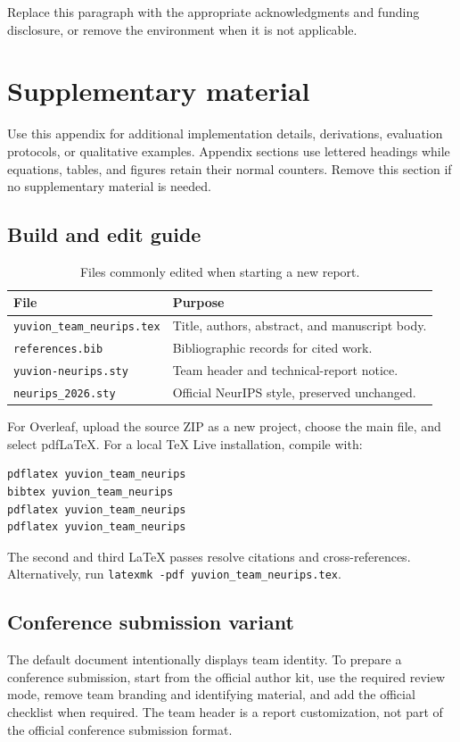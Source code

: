 \documentclass[10pt,letterpaper]{article}
\begin{document}
\begin{ack}
Replace this paragraph with the appropriate acknowledgments and funding
disclosure, or remove the environment when it is not applicable.
\end{ack}




\clearpage
\appendix
\section{Supplementary material}
\label{app:supp}
Use this appendix for additional implementation details, derivations,
evaluation protocols, or qualitative examples. Appendix sections use
lettered headings while equations, tables, and figures retain their normal
counters. Remove this section if no supplementary material is needed.

\subsection{Build and edit guide}
\begin{table}[h]
  \centering
  \caption{Files commonly edited when starting a new report.}
  \begin{tabularx}{\linewidth}{@{}lX@{}}
    \toprule
    File & Purpose\\
    \midrule
    \texttt{yuvion\_team\_neurips.tex} & Title, authors, abstract, and manuscript body.\\
    \texttt{references.bib} & Bibliographic records for cited work.\\
    \texttt{yuvion-neurips.sty} & Team header and technical-report notice.\\
    \texttt{neurips\_2026.sty} & Official NeurIPS style, preserved unchanged.\\
    \bottomrule
  \end{tabularx}
\end{table}

For Overleaf, upload the source ZIP as a new project, choose the main file,
and select pdfLaTeX. For a local TeX Live installation, compile with:
\begin{verbatim}
pdflatex yuvion_team_neurips
bibtex yuvion_team_neurips
pdflatex yuvion_team_neurips
pdflatex yuvion_team_neurips
\end{verbatim}
The second and third LaTeX passes resolve citations and cross-references.
Alternatively, run \verb|latexmk -pdf yuvion_team_neurips.tex|.

\subsection{Conference submission variant}
The default document intentionally displays team identity. To prepare a
conference submission, start from the official author kit, use the required
review mode, remove team branding and identifying material, and add the
official checklist when required. The team header is a report customization,
not part of the official conference submission format.
\end{document}
